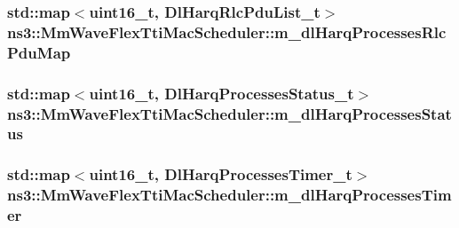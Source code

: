 \subsubsection[{\texorpdfstring{m\+\_\+dl\+Harq\+Processes\+Rlc\+Pdu\+Map}{m_dlHarqProcessesRlcPduMap}}]{\setlength{\rightskip}{0pt plus 5cm}std\+::map$<$uint16\+\_\+t, {\bf Dl\+Harq\+Rlc\+Pdu\+List\+\_\+t}$>$ ns3\+::\+Mm\+Wave\+Flex\+Tti\+Mac\+Scheduler\+::m\+\_\+dl\+Harq\+Processes\+Rlc\+Pdu\+Map\hspace{0.3cm}{\ttfamily [private]}}\hypertarget{classns3_1_1MmWaveFlexTtiMacScheduler_a7b37cf0428128dbfe578cd3c5d3ffbe9}{}\label{classns3_1_1MmWaveFlexTtiMacScheduler_a7b37cf0428128dbfe578cd3c5d3ffbe9}
\subsubsection[{\texorpdfstring{m\+\_\+dl\+Harq\+Processes\+Status}{m_dlHarqProcessesStatus}}]{\setlength{\rightskip}{0pt plus 5cm}std\+::map$<$uint16\+\_\+t, {\bf Dl\+Harq\+Processes\+Status\+\_\+t}$>$ ns3\+::\+Mm\+Wave\+Flex\+Tti\+Mac\+Scheduler\+::m\+\_\+dl\+Harq\+Processes\+Status\hspace{0.3cm}{\ttfamily [private]}}\hypertarget{classns3_1_1MmWaveFlexTtiMacScheduler_a7ea48669590368853d16240acf7dbebe}{}\label{classns3_1_1MmWaveFlexTtiMacScheduler_a7ea48669590368853d16240acf7dbebe}
\subsubsection[{\texorpdfstring{m\+\_\+dl\+Harq\+Processes\+Timer}{m_dlHarqProcessesTimer}}]{\setlength{\rightskip}{0pt plus 5cm}std\+::map$<$uint16\+\_\+t, {\bf Dl\+Harq\+Processes\+Timer\+\_\+t}$>$ ns3\+::\+Mm\+Wave\+Flex\+Tti\+Mac\+Scheduler\+::m\+\_\+dl\+Harq\+Processes\+Timer\hspace{0.3cm}{\ttfamily [private]}}\hypertarget{classns3_1_1MmWaveFlexTtiMacScheduler_a321e6f7863545e750acf6e94855514c5}{}\label{classns3_1_1MmWaveFlexTtiMacScheduler_a321e6f7863545e750acf6e94855514c5}
